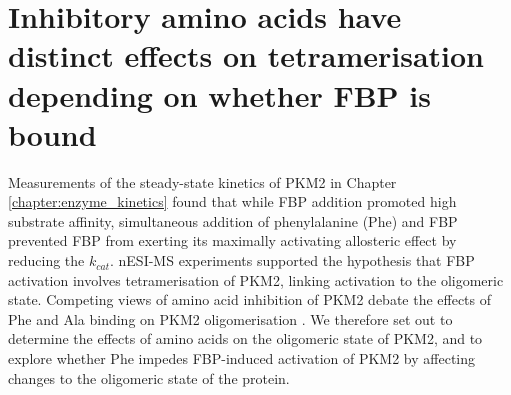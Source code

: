 \clearpage

\section{Inhibitory amino acids have distinct effects on tetramerisation depending on whether FBP is bound}
Measurements of the steady-state kinetics of PKM2 in Chapter \ref{chapter:enzyme_kinetics} found that while FBP addition promoted high substrate affinity, simultaneous addition of phenylalanine (Phe) and FBP prevented FBP from exerting its maximally activating allosteric effect by reducing the $k_{cat}$. nESI-MS experiments supported the hypothesis that FBP activation involves tetramerisation of PKM2, linking activation to the oligomeric state. Competing views of amino acid inhibition of PKM2 debate the effects of Phe and Ala binding on PKM2 oligomerisation \cite{Hofmann:1975aa,Yuan:2018aa,Morgan:2013aa}. We therefore set out to determine the effects of amino acids on the oligomeric state of PKM2, and to explore whether Phe impedes FBP-induced activation of PKM2 by affecting changes to the oligomeric state of the protein.


